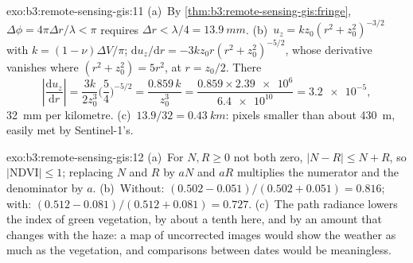 \begin{solution}{exo:b3:remote-sensing-gis:11}
(a)~By \cref{thm:b3:remote-sensing-gis:fringe}, $\Delta\phi =
4\pi\Delta r/\lambda < \pi$ requires $\Delta r < \lambda/4 =
\qty{13.9}{mm}$. (b)~$u_z = k z_0(r^2 + z_0^2)^{-3/2}$ with $k = (1 -
\nu)\Delta V/\pi$; $\mathrm du_z/\mathrm dr = -3kz_0r(r^2 + z_0^2)^{-5/2}$,
whose derivative vanishes where $(r^2 + z_0^2) = 5r^2$, at $r = z_0/2$. There
\[
\left|\frac{\mathrm du_z}{\mathrm dr}\right| = \frac{3k}{2z_0^3}\Big(\frac54\Big)^{-5/2}
= \frac{0.859\,k}{z_0^3} = \frac{0.859\times\num{2.39e6}}{\num{6.4e10}} = \num{3.2e-5},
\]
\qty{32}{mm} per kilometre. (c)~$13.9/32 = \qty{0.43}{km}$: pixels smaller
than about \qty{430}{m}, easily met by Sentinel-1's.
\end{solution}

\begin{solution}{exo:b3:remote-sensing-gis:12}
(a)~For $N, R \ge 0$ not both zero, $|N - R| \le N + R$, so $|\mathrm{NDVI}|
\le 1$; replacing $N$ and $R$ by $aN$ and $aR$ multiplies the numerator and
the denominator by $a$. (b)~Without: $(0.502 - 0.051)/(0.502 + 0.051) =
0.816$; with: $(0.512 - 0.081)/(0.512 + 0.081) = 0.727$. (c)~The path
radiance lowers the index of green vegetation, by about a tenth here, and
by an amount that changes with the haze: a map of uncorrected images would
show the weather as much as the vegetation, and comparisons between dates
would be meaningless.
\end{solution}

